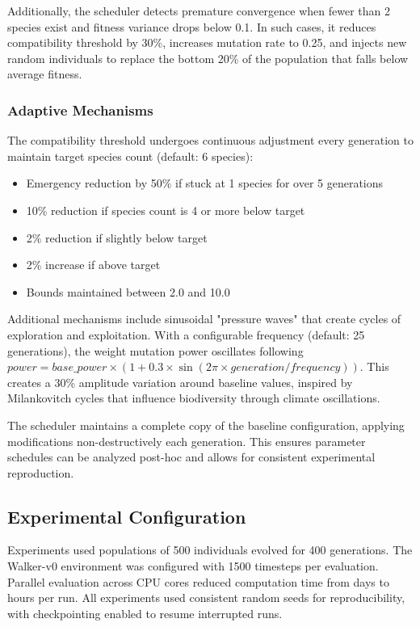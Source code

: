 \documentclass[conference]{IEEEtran}
\begin{document}
Additionally, the scheduler detects premature convergence when fewer than 2 species exist and fitness variance drops below 0.1. In such cases, it reduces compatibility threshold by 30\%, increases mutation rate to 0.25, and injects new random individuals to replace the bottom 20\% of the population that falls below average fitness.

\subsubsection{Adaptive Mechanisms}
The compatibility threshold undergoes continuous adjustment every generation to maintain target species count (default: 6 species):
\begin{itemize}
    \item Emergency reduction by 50\% if stuck at 1 species for over 5 generations
    \item 10\% reduction if species count is 4 or more below target
    \item 2\% reduction if slightly below target
    \item 2\% increase if above target
    \item Bounds maintained between 2.0 and 10.0
\end{itemize}

Additional mechanisms include sinusoidal "pressure waves" that create cycles of exploration and exploitation. With a configurable frequency (default: 25 generations), the weight mutation power oscillates following $power = base\_power \times (1 + 0.3 \times \sin(2\pi \times generation / frequency))$. This creates a 30\% amplitude variation around baseline values, inspired by Milankovitch cycles that influence biodiversity through climate oscillations.

The scheduler maintains a complete copy of the baseline configuration, applying modifications non-destructively each generation. This ensures parameter schedules can be analyzed post-hoc and allows for consistent experimental reproduction.

\subsection{Experimental Configuration}
Experiments used populations of 500 individuals evolved for 400 generations. The Walker-v0 environment was configured with 1500 timesteps per evaluation. Parallel evaluation across CPU cores reduced computation time from days to hours per run. All experiments used consistent random seeds for reproducibility, with checkpointing enabled to resume interrupted runs.
\end{document}
